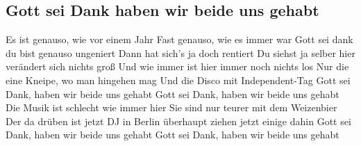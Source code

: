 \subsection*{Gott sei Dank haben wir beide uns gehabt   }
\begin{guitar}
Es ist genauso, wie vor einem Jahr
Fast genauso, wie es immer war
Gott sei dank du bist genauso ungeniert
Dann hat sich's ja doch rentiert
Du siehst ja selber hier verändert sich nichts groß
Und wie immer ist hier immer noch nichts los
Nur die eine Kneipe, wo man hingehen mag
Und die Disco mit Independent-Tag
Gott sei Dank, haben wir beide uns gehabt
Gott sei Dank, haben wir beide uns gehabt
Die Musik ist schlecht wie immer hier
Sie sind nur teurer mit dem Weizenbier
Der da drüben ist jetzt DJ in Berlin
überhaupt ziehen jetzt einige dahin
Gott sei Dank, haben wir beide uns gehabt
Gott sei Dank, haben wir beide uns gehabt 
\end{guitar}
